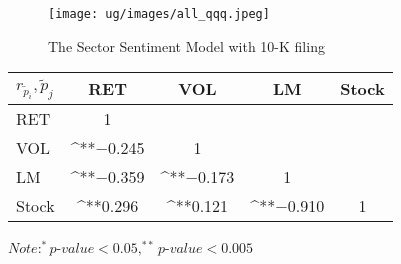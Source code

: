 \documentclass[logo,bsc,singlespacing,parskip]{infthesis}
\begin{document}
\begin{figure}[h]
\begin{minipage}[p]{1.0\textwidth}
    \centering
    \texttt{[image: ug/images/all\_qqq.jpeg]}
    \caption{The Sector Sentiment Model with 10-K filing}
    \label{fig:all_qqq}
\end{minipage}%
\end{figure}

\begin{minipage}[p]{1.0\textwidth}
    \centering
    \begin{tabular}{lcccc}
    \label{tab:all_qqq_corr2}
    $r_\tilde{p}_i,\tilde{p}_j$      & RET       & VOL       & LM        & Stock    \\ \hline
    RET    & 1  &   &  &  \\
    VOL    & ^{**}$-$0.245  & 1  &  &   \\
    LM    & ^{**}$-$0.359 & ^{**}$-$0.173 & 1  &  \\
    Stock  & ^{**}0.296 & ^{**}0.121  & ^{**}$-$0.910 & 1  \\ \hline
    \end{tabular}
    \medskip
    $\textit{Note}: ^{*}p$-$value<0.05, ^{**}p$-$value<0.005$
\end{minipage}





    
\end{document}

